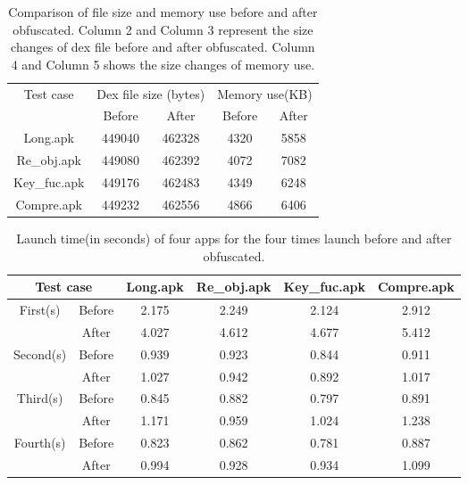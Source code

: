 \begin{table}[htbp]
  \centering
  \begin{tabular}{c c c c c}
  \toprule
  \multirow{2}{*}{Test case} & \multicolumn{2}{c}{Dex file size (bytes)} & \multicolumn{2}{c}{Memory use(KB)}\\
  \cline{2-5}
  \cmidrule{2-5}

  & Before & After &  Before & After\\
  \hline

  Long.apk & 449040 & 462328 & 4320 & 5858\\
   \rowcolor{mygray}


  Re\_obj.apk & 449080 & 462392 & 4072 & 7082\\


  Key\_fuc.apk & 449176 & 462483 & 4349 & 6248\\

\rowcolor{mygray}
  Compre.apk & 449232 & 462556 & 4866 & 6406\\
  \bottomrule
  \end{tabular}
  \caption{Comparison of file size and memory use before and after obfuscated. Column 2 and Column 3 represent the size changes of dex file before and after obfuscated. Column 4 and Column 5 shows the size changes of memory use.}\label{tab:Table 3}
\end{table}

\begin{table}[htbp]
  \centering
  \begin{tabular}{c c c c c c}
  \toprule

  \multicolumn{2}{c}{Test case} & Long.apk & Re\_obj.apk & Key\_fuc.apk & Compre.apk\\
  \hline
   \hline
  \multirow{2}{*}{First(s)} & Before & 2.175 & 2.249 & 2.124 & 2.912\\
  & After & 4.027 & 4.612 & 4.677 & 5.412\\
  \hline


  \multirow{2}{*}{Second(s)} & Before & 0.939 & 0.923 & 0.844 & 0.911\\
  & After & 1.027 & 0.942 & 0.892 & 1.017\\
  \hline

  \multirow{2}{*}{Third(s)} & Before & 0.845 & 0.882 & 0.797 & 0.891\\
  & After & 1.171 & 0.959 & 1.024 & 1.238\\
  \hline

  \multirow{2}{*}{Fourth(s)} & Before & 0.823 & 0.862 & 0.781 & 0.887\\
  & After & 0.994 & 0.928 & 0.934 & 1.099\\

  \bottomrule
  \end{tabular}
   \caption{Launch time(in seconds) of four apps for the four times launch before and after obfuscated.}\label{tab:Table 4}
\end{table} 